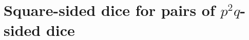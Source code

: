 \documentclass[11pt]{amsart}
\numberwithin{equation}{section}
\theoremstyle{plain}
\theoremstyle{definition}
\begin{document}















\section{Square-sided dice for pairs of $p^2q$-sided dice}\label{sec:psquaredq}
\end{document}
